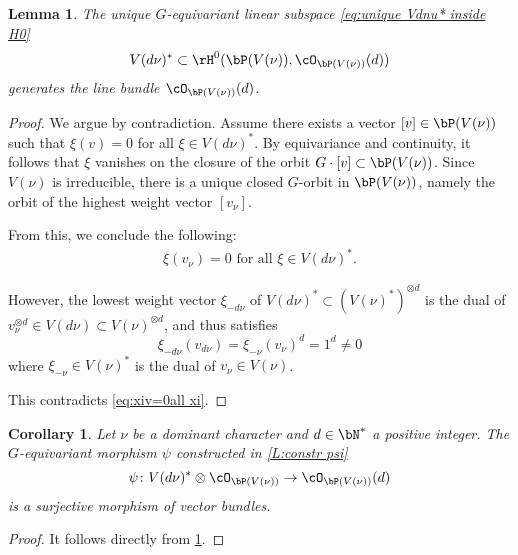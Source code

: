 \documentclass[reqno, 10pt]{amsart}
\theoremstyle{plain}
\newtheorem{lemma}[proposition]{Lemma}
\newtheorem{corollary}[proposition]{Corollary}
\theoremstyle{definition}
\numberwithin{equation}{section}%
\begin{document}
\begin{lemma}\label{L:Vdnu*generates}
	The unique $G$-equivariant linear subspace \eqref{eq:unique Vdnu* inside H0}
	\[ V(d\nu)^*\subset \rH^0(\bP(V(\nu)),\cO_{\bP(V(\nu))}(d))\]
	generates the line bundle $\cO_{\bP(V(\nu))}(d)$.
\end{lemma}
\begin{proof}
We argue by contradiction. Assume there exists a vector $[v] \in \bP(V(\nu))$ such that $\xi(v) = 0$ for all $\xi \in V(d\nu)^*$. By equivariance and continuity, it follows that $\xi$ vanishes on the closure of the orbit $G \cdot [v] \subset \bP(V(\nu))$. Since $V(\nu)$ is irreducible, there is a unique closed $G$-orbit in $\bP(V(\nu))$, namely the orbit of the highest weight vector $[v_\nu]$.  

From this, we conclude the following:  
\begin{align}\label{eq:xiv=0all xi}  
	\xi(v_\nu) = 0 \text{ for all } \xi \in V(d\nu)^*.  
\end{align}  

However, the lowest weight vector $\xi_{-d\nu}$ of $V(d\nu)^* \subset (V(\nu)^*)^{\otimes d}$ is the dual of $v_\nu^{\otimes d} \in V(d\nu) \subset V(\nu)^{\otimes d}$, and thus satisfies  
\[ \xi_{-d\nu}(v_{d\nu}) = \xi_{-\nu}(v_\nu)^d = 1^d \neq 0 \]  
where $\xi_{-\nu} \in V(\nu)^*$ is the dual of $v_\nu \in V(\nu)$.  

This contradicts \eqref{eq:xiv=0all xi}.  
\end{proof}

\begin{corollary}\label{C:surjective onto line bundle}
	Let $\nu$ be a dominant character and $d\in\bN^*$ a positive integer.
	The $G$-equivariant morphism $\psi$ constructed in \cref{L:constr psi} 
\[\psi\colon V(d\nu)^*\otimes\cO_{\bP(V(\nu))}\to \cO_{\bP(V(\nu))}(d)\]
is a surjective morphism of vector bundles.
\end{corollary}
\begin{proof}
	It follows directly from \cref{L:Vdnu*generates}.
\end{proof}
\end{document}
